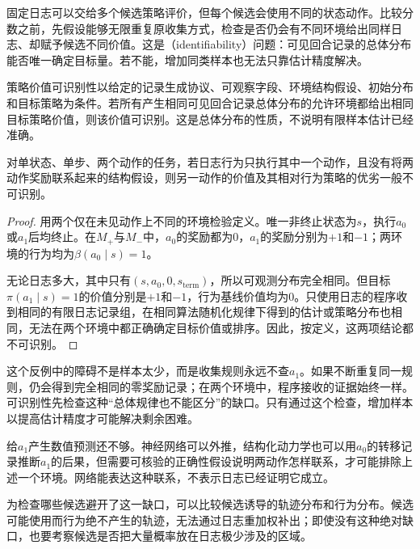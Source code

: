 固定日志可以交给多个候选策略评价，但每个候选会使用不同的状态动作。比较分数之前，先假设能够无限重复原收集方式，检查是否仍会有不同环境给出同样日志、却赋予候选不同价值。这是（identifiability）问题：可见回合记录的总体分布能否唯一确定目标量。若不能，增加同类样本也无法只靠估计精度解决。

\begin{definition}[策略价值可识别]
  \label{def:rl-information-identifiability}
  策略价值可识别性以给定的记录生成协议、可观察字段、环境结构假设、初始分布和目标策略为条件。若所有产生相同可见回合记录总体分布的允许环境都给出相同目标策略价值，则该价值可识别。这是总体分布的性质，不说明有限样本估计已经准确。
\end{definition}

\begin{theorem}[固定经验不能识别未覆盖动作的价值]
  \label{thm:rl-information-unseen-action}
  对单状态、单步、两个动作的任务，若日志行为只执行其中一个动作，且没有将两动作奖励联系起来的结构假设，则另一动作的价值及其相对行为策略的优劣一般不可识别。
\end{theorem}

\begin{proof}
  用两个仅在未见动作上不同的环境检验定义。唯一非终止状态为$s$，执行$a_0$或$a_1$后均终止。在$M_+$与$M_-$中，$a_0$的奖励都为0，$a_1$的奖励分别为$+1$和$-1$；两环境的行为均为$\beta(a_0\mid s)=1$。

  无论日志多大，其中只有$(s,a_0,0,s_{\mathrm{term}})$，所以可观测分布完全相同。但目标$\pi(a_1\mid s)=1$的价值分别是$+1$和$-1$，行为基线价值均为0。只使用日志的程序收到相同的有限日志记录组，在相同算法随机化规律下得到的估计或策略分布也相同，无法在两个环境中都正确确定目标价值或排序。因此，按定义，这两项结论都不可识别。
\end{proof}

这个反例中的障碍不是样本太少，而是收集规则永远不查$a_1$。如果不断重复同一规则，仍会得到完全相同的零奖励记录；在两个环境中，程序接收的证据始终一样。可识别性先检查这种“总体规律也不能区分”的缺口。只有通过这个检查，增加样本以提高估计精度才可能解决剩余困难。

给$a_1$产生数值预测还不够。神经网络可以外推，结构化动力学也可以用$a_0$的转移记录推断$a_1$的后果，但需要可核验的正确性假设说明两动作怎样联系，才可能排除上述一个环境。网络能表达这种联系，不表示日志已经证明它成立。

为检查哪些候选避开了这一缺口，可以比较候选诱导的轨迹分布和行为分布。候选可能使用而行为绝不产生的轨迹，无法通过日志重加权补出；即使没有这种绝对缺口，也要考察候选是否把大量概率放在日志极少涉及的区域。

